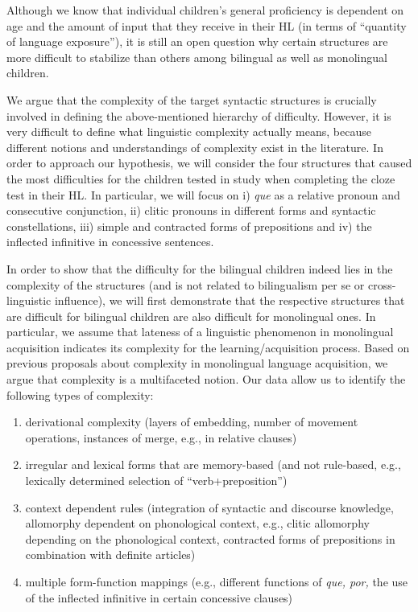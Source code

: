\documentclass[output=paper]{langscibook}
\begin{document}
Although we know that individual children's general proficiency is dependent on age and the amount of input that they receive in their HL (in terms of “quantity of language exposure”), it is still an open question why certain structures are more difficult to stabilize than others among bilingual as well as monolingual children.  

We argue that the complexity of the target syntactic structures is crucially involved in defining the above-mentioned hierarchy of difficulty. However, it is very difficult to define what linguistic complexity actually means, because different notions and understandings of complexity exist in the literature. In order to approach our hypothesis, we will consider the four structures that caused the most difficulties for the children tested in  study when completing the cloze test in their HL. In particular, we will focus on i) \textit{que} as a relative pronoun and consecutive conjunction, ii) clitic pronouns in different forms and syntactic constellations, iii) simple and contracted forms of prepositions and iv) the inflected infinitive in concessive sentences.

In order to show that the difficulty for the bilingual children indeed lies in the complexity of the structures (and is not related to bilingualism per se or cross-linguistic influence), we will first demonstrate that the respective structures that are difficult for bilingual children are also difficult for monolingual ones. In particular, we assume that lateness of a linguistic phenomenon in monolingual acquisition indicates its complexity for the learning\slash acquisition process. Based on previous proposals about complexity in monolingual language acquisition, we argue that complexity is a multifaceted notion. Our data allow us to identify the following types of complexity:

\begin{enumerate}[label=\roman*.]
\item derivational complexity (layers of embedding, number of movement operations, instances of merge, e.g., in relative clauses)
\item irregular and lexical forms that are memory-based (and not rule-based, e.g., lexically determined selection of “verb+preposition”)
\item context dependent rules (integration of syntactic and discourse knowledge, allomorphy dependent on phonological context, e.g., clitic allomorphy depending on the phonological context, contracted forms of prepositions in combination with definite articles) 
\item multiple form-function mappings (e.g., different functions of \textit{que, por,} the use of the inflected infinitive in certain concessive clauses) 
\end{enumerate}
\end{document}
